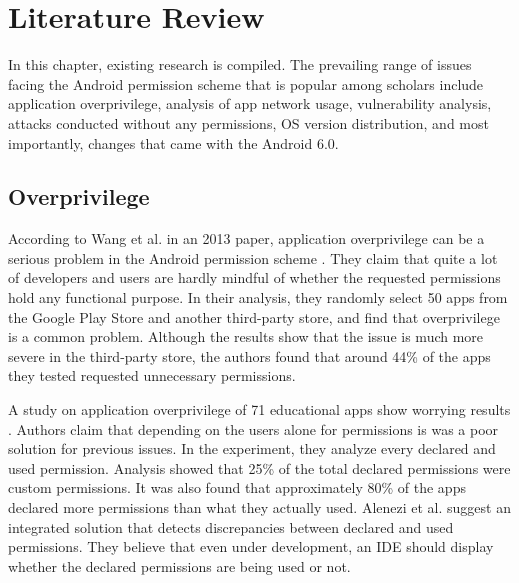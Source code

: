 \documentclass[
  a4paper,  %
  twoside,  %
  bibliography=totoc,
  headsepline,
  cleardoublepage=empty,
  parskip=half,
  draft=false,
  open=any
]{scrbook}
\begin{document}
\chapter{Literature Review}
\label{cha:litreview}

In this chapter, existing research is compiled. The prevailing range of issues facing the Android permission scheme that is popular among scholars include application overprivilege, analysis of app network usage, vulnerability analysis, attacks conducted without any permissions, OS version distribution, and most importantly, changes that came with the Android 6.0.

\section{Overprivilege}
According to Wang et al. in an 2013 paper, application overprivilege can be a serious problem in the Android permission scheme \cite{wang2013}. They claim that quite a lot of developers and users are hardly mindful of whether the requested permissions hold any functional purpose. In their analysis, they randomly select 50 apps from the Google Play Store and another third-party store, and find that overprivilege is a common problem. Although the results show that the issue is much more severe in the third-party store, the authors found that around 44\% of the apps they tested requested unnecessary permissions.

A study on application overprivilege of 71 educational apps show worrying results \cite{alenezi2017}. Authors claim that depending on the users alone for permissions is was a poor solution for previous issues. In the experiment, they analyze every declared and used permission. Analysis showed that 25\% of the total declared permissions were custom permissions. It was also found that approximately 80\% of the apps declared more permissions than what they actually used. Alenezi et al. suggest an integrated solution that detects discrepancies between declared and used permissions. They believe that even under development, an IDE should display whether the declared permissions are being used or not.
\end{document}
